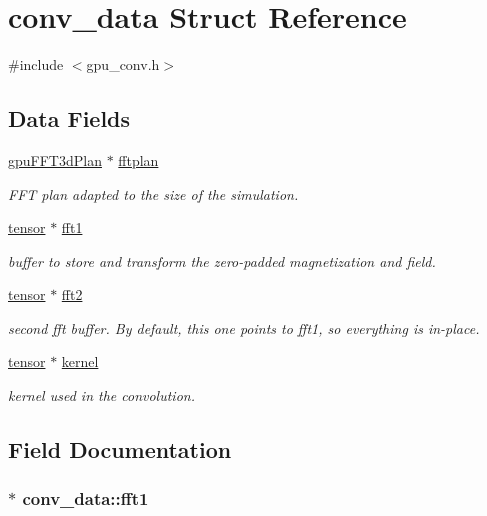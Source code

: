 \hypertarget{structconv__data}{
\section{conv\_\-data Struct Reference}
\label{structconv__data}
}


{\ttfamily \#include $<$gpu\_\-conv.h$>$}

\subsection*{Data Fields}
\begin{DoxyCompactItemize}
\item 
\hyperlink{structgpuFFT3dPlan}{gpuFFT3dPlan} $\ast$ \hyperlink{structconv__data_af91d107dc66437db0509684934b7a619}{fftplan}
\begin{DoxyCompactList}\small\item\em FFT plan adapted to the size of the simulation. \item\end{DoxyCompactList}\item 
\hyperlink{structtensor}{tensor} $\ast$ \hyperlink{structconv__data_acba82a3d6502621444c433d531d8a369}{fft1}
\begin{DoxyCompactList}\small\item\em buffer to store and transform the zero-\/padded magnetization and field. \item\end{DoxyCompactList}\item 
\hyperlink{structtensor}{tensor} $\ast$ \hyperlink{structconv__data_acfc7804271fbbdfaedba888f1b640b90}{fft2}
\begin{DoxyCompactList}\small\item\em second fft buffer. By default, this one points to fft1, so everything is in-\/place. \item\end{DoxyCompactList}\item 
\hyperlink{structtensor}{tensor} $\ast$ \hyperlink{structconv__data_acf63607af623a717c8068413ed98c47a}{kernel}
\begin{DoxyCompactList}\small\item\em kernel used in the convolution. \item\end{DoxyCompactList}\end{DoxyCompactItemize}


\subsection{Field Documentation}
\hypertarget{structconv__data_acba82a3d6502621444c433d531d8a369}{
\subsubsection[{fft1}]{$\ast$ {\bf conv\_\-data::fft1}}}
\label{structconv__data_acba82a3d6502621444c433d531d8a369}


